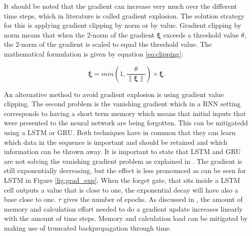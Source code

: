 It should be noted that the gradient can increase very much over the different time steps, which in literature is called gradient explosion. The solution strategy for this is applying gradient clipping by norm or by value. Gradient clipping by norm means that when the 2-norm of the gradient $ \bm{\xi} $ exceeds a threshold value $ \theta $, the 2-norm of the gradient is scaled to equal the threshold value. The mathematical formulation is given by equation \ref{eq:clipping}:

\begin{equation}\label{eq:clipping}
	\bm{\xi}= min(1,\frac{\theta}{\| \bm{\xi} \|})\times\bm{\xi}.
\end{equation}

An alternative method to avoid gradient explosion is using gradient value clipping. The second problem is the vanishing gradient which in a RNN setting corresponds to having a short term memory which means that initial inputs that were presented to the neural network are being forgotten. This can be mitigatedd using a LSTM or GRU. Both techniques have in common that they can learn which data in the sequence is important and should be retained and which information can be thrown away. It is important to state that LSTM and GRU are not solving the vanishing gradient problem as explained in \cite{Teuwen2019}. The gradient is still exponentially decreasing, but the effect is less pronounced as can be seen for LSTM in Figure \ref{fig:grad_exp}. When the forget gate, that sits inside a LSTM cell outputs a value that is close to one, the exponential decay will have also a base close to one. $ \tau $ gives the number of epochs. As discussed in \cite{Teuwen2019}, the amount of memory and calculation effort needed to do a gradient update increases linearly with the amount of time steps. Memory and calculation load can be mitigated by making use of truncated backpropagation through time.\\  


